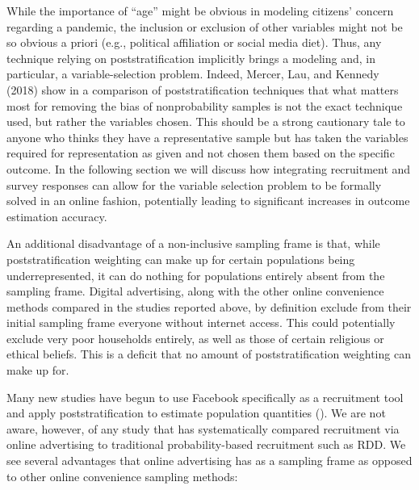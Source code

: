 \documentclass[a4paper,12pt]{article}
\theoremstyle{proposition}
\begin{document}
While the importance of “age” might be obvious in modeling citizens’ concern regarding a pandemic, the inclusion or exclusion of other variables might not be so obvious a priori (e.g., political affiliation or social media diet). Thus, any technique relying on poststratification implicitly brings a modeling and, in particular, a variable-selection problem. Indeed, Mercer, Lau, and Kennedy (2018) show in a comparison of poststratification techniques that what matters most for removing the bias of nonprobability samples is not the exact technique used, but rather the variables chosen. This should be a strong cautionary tale to anyone who thinks they have a representative sample but has taken the variables required for representation as given and not chosen them based on the specific outcome. In the following section we will discuss how integrating recruitment and survey responses can allow for the variable selection problem to be formally solved in an online fashion, potentially leading to significant increases in outcome estimation accuracy.

An additional disadvantage of a non-inclusive sampling frame is that, while poststratification weighting can make up for certain populations being underrepresented, it can do nothing for populations entirely absent from the sampling frame. Digital advertising, along with the other online convenience methods compared in the studies reported above, by definition exclude from their initial sampling frame everyone without internet access. This could potentially exclude very poor households entirely, as well as those of certain religious or ethical beliefs. This is a deficit that no amount of poststratification weighting can make up for.

Many new studies have begun to use Facebook specifically as a recruitment tool and apply poststratification to estimate population quantities (\cite{Zagheni2017,Perrotta2020}). We are not aware, however, of any study that has systematically compared recruitment via online advertising to traditional probability-based recruitment such as RDD. We see several advantages that online advertising has as a sampling frame as opposed to other online convenience sampling methods:
\end{document}
